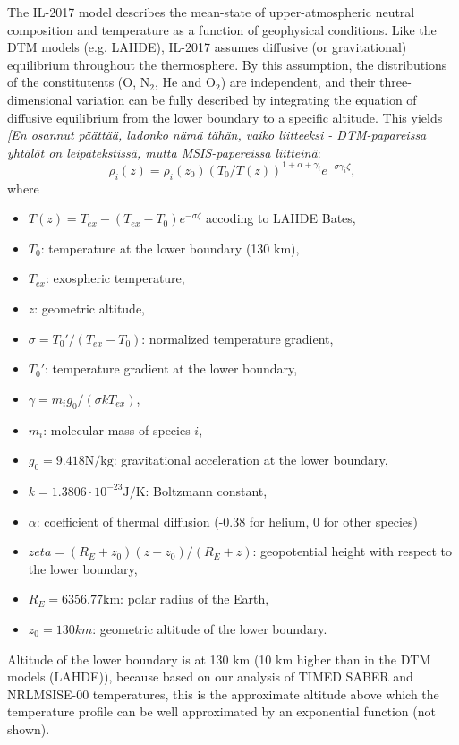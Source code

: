 \documentclass[referee,a4paper,12pt,traditabstract]{swsc}
\begin{document}
\begin{linenumbers}
The IL-2017 model describes the mean-state of upper-atmospheric neutral composition and temperature as a function of geophysical conditions. Like the DTM models (e.g. LAHDE), IL-2017 assumes diffusive (or gravitational) equilibrium throughout the thermosphere. By this assumption, the distributions of the constitutents (O, $\mathrm{N_{2}}$, He and $\mathrm{O_{2}}$) are independent, and their three-dimensional variation can be fully described by integrating the equation of diffusive equilibrium from the lower boundary to a specific altitude. This yields \textit{[En osannut p\"a\"att\"a\"a, ladonko n\"am\"a t\"ah\"an, vaiko liitteeksi - DTM-papareissa yht\"al\"ot on leip\"atekstiss\"a, mutta MSIS-papereissa liittein\"a}:
\begin{equation}
\rho_i(z) = \rho_i(z_0) (T_0 / T(z))^{1+\alpha+\gamma_i}e^{-\sigma \gamma_i \zeta},
\end{equation}
where 
\begin{itemize}
\item $T(z) = T_{ex} - (T_{ex} - T_0) e^{-\sigma \zeta}$ accoding to LAHDE Bates,
\item $T_0$: temperature at the lower boundary (130 km),
\item $T_{ex}$: exospheric temperature,
\item $z$: geometric altitude,
\item $\sigma = T_0'/(T_{ex} - T_0)$: normalized temperature gradient,
\item $T_0'$: temperature gradient at the lower boundary,
\item $\gamma = m_i g_0 / (\sigma k T_{ex})$,
\item $m_i$: molecular mass of species $i$,
\item $g_0 = 9.418 \mathrm{N/kg}$: gravitational acceleration at the lower boundary,
\item $k = 1.3806 \cdot 10^{-23} \mathrm{J/K}$: Boltzmann constant,
\item $\alpha$: coefficient of thermal diffusion (-0.38 for helium, 0 for other species)
\item $zeta = (R_E + z_0)(z - z_0)/(R_E + z)$: geopotential height with respect to the lower boundary,
\item $R_E = 6356.77 \mathrm{km}$: polar radius of the Earth,
\item $z_0 = 130 km$: geometric altitude of the lower boundary.
\end{itemize}
Altitude of the lower boundary is at 130 km (10 km higher than in the DTM models (LAHDE)), because based on our analysis of TIMED SABER and NRLMSISE-00 temperatures, this is the approximate altitude above which the temperature profile can be well approximated by an exponential function (not shown).


\end{linenumbers}
\end{document}
